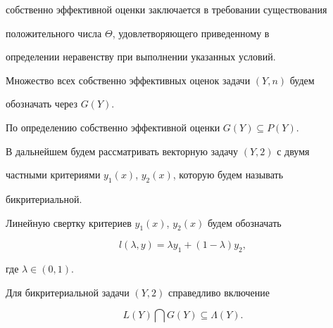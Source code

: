 собственно эффективной оценки заключается в требовании существования 


положительного числа $\Theta$, удовлетворяющего приведенному в 


определении неравенству при выполнении указанных условий. 


 


Множество всех собственно эффективных оценок задачи $(Y,n)$ будем 


обозначать через $G(Y)$. 


По определению собственно эффективной оценки $G(Y)\subseteq P(Y)$. 


 


В дальнейшем будем рассматривать векторную задачу $(Y,2)$ с двумя 


частными критериями $y_1(x)$, $y_2(x)$, которую будем называть 


бикритериальной. 


Линейную свертку критериев $y_1(x)$, $y_2(x)$ будем обозначать 


$$ 


l(\lambda,y)=\lambda y_1+(1-\lambda)y_2, 


$$ 


где $\lambda\in(0,1)$. 


 


\begin{lem} Для бикритериальной задачи $(Y,2)$ справедливо включение 


$$ 


L(Y)\bigcap G(Y)\subseteq\Lambda(Y). 


$$ 


\end{lem} 


 


